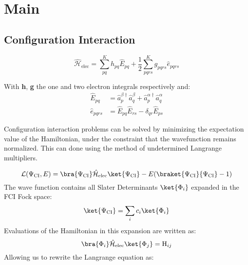 \chapter{Main}
\section{Configuration Interaction}

\begin{equation}\label{eq:ham}
      \hat{\mathcal{H}}_\text{elec} = \sum_{pq}^K h_{pq} \hat{E}_{pq} + \frac{1}{2} \sum_{pqrs}^K g_{pqrs} \hat{e}_{pqrs}
  \end{equation}

  With \textbf{h}, \textbf{g} the one and two electron integrals respectively and:
  \begin{align}
      \hat{E}_{pq} & = \hat{a}^{\beta \dagger}_p \hat{a}^{\beta}_q + \hat{a}^{\alpha \dagger}_p \hat{a}^{\alpha}_q \\
      \hat{e}_{pqrs} & = \hat{E}_{pq}  \hat{E}_{rs} - \delta_{qr} \hat{E}_{ps}
  \end{align}

  Configuration interaction problems can be solved by minimizing the expectation value of the Hamiltonian, under the constraint that the wavefunction remains normalized. This can done using the method of undetermined Langrange multipliers.

\begin{equation}\label{eq:ham}
      \mathcal{L}(\Psi_{\text{CI}}, E) = \bra{\Psi_{\text{CI}}} \hat{\mathcal{H}}_\text{elec} \ket{\Psi_{\text{CI}}} - E (\braket{\Psi_{\text{CI}}}{\Psi_{\text{CI}}} - 1)
  \end{equation}
The wave function contains all Slater Determinants $\ket{\Phi_i}$ expanded in the FCI Fock space:
\begin{equation}
  \ket{\Psi_{\text{CI}}} = \sum_i c_i \ket{\Phi_i}
\end{equation}
Evaluations of the Hamiltonian in this expansion are written as:
\begin{equation}
  \bra{\Phi_i} \hat{\mathcal{H}}_\text{elec} \ket{\Phi_j} = \text{H}_{ij}
\end{equation}
Allowing us to rewrite the Langrange equation as:

